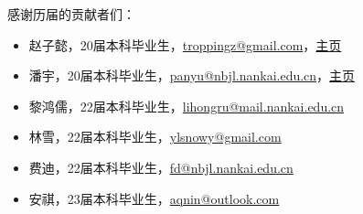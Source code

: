 \documentclass{nkuthesis}
\begin{document}
\begin{acknowledgement}
  感谢历届的贡献者们：
  \begin{itemize}
    \item 赵子懿，20届本科毕业生，\url{troppingz@gmail.com}，\href{https://tr0py.github.io/}{主页}
    \item 潘宇，20届本科毕业生，\url{panyu@nbjl.nankai.edu.cn}，\href{https://nbjl.nankai.edu.cn/2019/0513/c19244a264683/page.htm}{主页}
    \item 黎鸿儒，22届本科毕业生，\url{lihongru@mail.nankai.edu.cn}
    \item 林雪，22届本科毕业生，\url{ylsnowy@gmail.com}
    \item 费迪，22届本科毕业生，\url{fd@nbjl.nankai.edu.cn}
    \item 安祺，23届本科毕业生，\url{aqnin@outlook.com}
  \end{itemize}
\end{acknowledgement}
\end{document}
